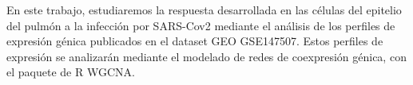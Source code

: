 \documentclass{article}
\begin{document}
		
		\noindent En este trabajo, estudiaremos la respuesta desarrollada en las células del epitelio del pulmón a la infección por SARS-Cov2 mediante el análisis de los perfiles de expresión génica publicados en el dataset GEO GSE147507. Estos perfiles de expresión se analizarán mediante el modelado de redes de coexpresión génica, con el paquete de R WGCNA.
		
\end{document}

